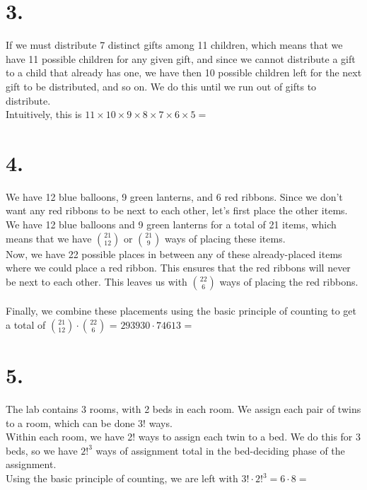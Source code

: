 \documentclass{article}
\begin{document}
\section*{3.}
{\Large 

If we must distribute 7 distinct gifts among 11 children, which means that we have 11 possible children for any given gift, and since we cannot distribute a gift to a child that already has one, we have then 10 possible children left for the next gift to be distributed, and so on. We do this until we run out of gifts to distribute. \\
Intuitively, this is $11 \times 10 \times 9 \times 8 \times 7 \times 6 \times 5 = $ 

}

\section*{4.}
{\Large 

We have 12 blue balloons, 9 green lanterns, and 6 red ribbons. Since we don't want any red ribbons to be next to each other, let's first place the other items. We have 12 blue balloons and 9 green lanterns for a total of 21 items, which means that we have $\binom{21}{12}$ or $\binom{21}{9}$ ways of placing these items. \\ 
Now, we have 22 possible places in between any of these already-placed items where we could place a red ribbon. This ensures that the red ribbons will never be next to each other. This leaves us with $\binom{22}{6}$ ways of placing the red ribbons. \\ \\ 
Finally, we combine these placements using the basic principle of counting to get a total of $\binom{21}{12} \cdot \binom{22}{6}$ = $293930 \cdot 74613$ = 

}

\section*{5.}
{\Large 

The lab contains 3 rooms, with 2 beds in each room. We assign each pair of twins to a room, which can be done $3!$ ways. \\
Within each room, we have 2! ways to assign each twin to a bed. We do this for 3 beds, so we have ${2!}^3$ ways of assignment total in the bed-deciding phase of the assignment. \\ Using the basic principle of counting, we are left with $3! \cdot {2!}^3 = 6 \cdot 8 = $ 

}
\end{document}
